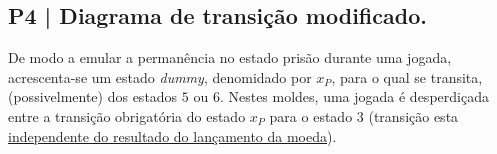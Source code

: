 \clearpage
\usetikzlibrary{automata, arrows.meta, positioning}
\subsection{P4 | Diagrama de transição modificado.}
\label{subsec:P4}

De modo a emular a permanência no estado prisão durante uma jogada, acrescenta-se um estado \textit{dummy}, denomidado por $x_P$, para o qual se transita, (possivelmente) dos estados $5$ ou $6$. Nestes moldes, uma jogada é desperdiçada entre a transição obrigatória do estado $x_P$ para o estado $3$ (transição esta \underline{independente do resultado do lançamento da moeda}).

